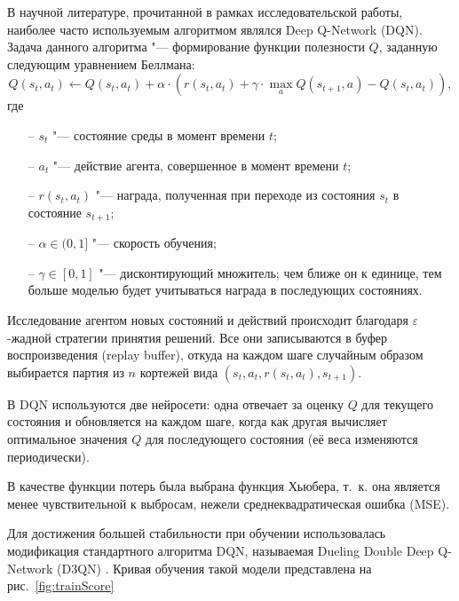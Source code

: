 В научной литературе, прочитанной в рамках исследовательской работы, наиболее часто используемым алгоритмом являлся Deep Q-Network (DQN). Задача данного алгоритма "--- формирование функции полезности \(Q\), заданную следующим уравнением Беллмана: \[Q(s_t, a_t) \leftarrow Q(s_t, a_t) + \alpha \cdot (r(s_t, a_t) + \gamma \cdot \max_a Q(s_{t+1}, a) - Q(s_t, a_t)),\] где 
\begin{itemize}
	\item[--] \(s_t\) "--- состояние среды в момент времени \(t\); 
	\item[--]  \(a_t\) "--- действие агента, совершенное в момент времени \(t\);
	\item[--] \(r(s_t, a_t)\) "--- награда, полученная при переходе из состояния \(s_t\) в состояние \(s_{t+1}\);
	\item[--] \(\alpha \in (0, 1]\) "--- скорость обучения;
	\item[--] \(\gamma \in [0, 1]\) "--- дисконтирующий множитель; чем ближе он к единице, тем больше моделью будет учитываться награда в последующих состояниях.
\end{itemize}

Исследование агентом новых состояний и действий происходит благодаря $\varepsilon$-жадной стратегии принятия решений. Все они записываются в буфер воспроизведения (replay buffer), откуда на каждом шаге случайным образом выбирается партия из \(n\) кортежей вида \((s_t, a_t, r(s_t, a_t), s_{t+1})\).

В DQN используются две нейросети: одна отвечает за оценку \(Q\) для текущего состояния и обновляется на каждом шаге, когда как другая вычисляет оптимальное значения \(Q\) для последующего состояния (её веса изменяются периодически).

В качестве функции потерь была выбрана функция Хьюбера, т.~к. она является менее чувствительной к выбросам, нежели среднеквадратическая ошибка (MSE).

Для достижения большей стабильности при обучении использовалась модификация стандартного алгоритма DQN, называемая Dueling Double Deep Q-Network (D3QN) \cite{wang2016dueling,hasselt2016deep}. Кривая обучения такой модели представлена на рис.~\ref{fig:trainScore}

